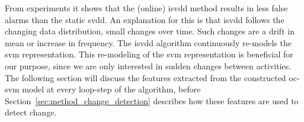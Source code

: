 From experiments it shows that the (online) \gls{isvdd} method results in less false alarms than the static \gls{svdd}.
An explanation for this is that \gls{isvdd} follows the changing data distribution, \ie small changes over time.
Such changes are a drift in mean or increase in frequency.
The \gls{isvdd} algorithm continuously re-models the \gls{svm} representation.
This re-modeling of the \gls{svm} representation is beneficial for our purpose, since we are only interested in sudden changes between activities.
The following section will discuss the features extracted from the constructed \gls{oc-svm} model at every loop-step of the algorithm, before Section~\ref{sec:method_change_detection} describes how these features are used to detect change.